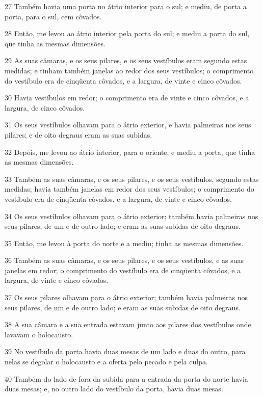 \par 27 Também havia uma porta no átrio interior para o sul; e mediu, de porta a porta, para o sul, cem côvados.
\par 28 Então, me levou ao átrio interior pela porta do sul; e mediu a porta do sul, que tinha as mesmas dimensões.
\par 29 As suas câmaras, e os seus pilares, e os seus vestíbulos eram segundo estas medidas; e tinham também janelas ao redor dos seus vestíbulos; o comprimento do vestíbulo era de cinqüenta côvados, e a largura, de vinte e cinco côvados.
\par 30 Havia vestíbulos em redor; o comprimento era de vinte e cinco côvados, e a largura, de cinco côvados.
\par 31 Os seus vestíbulos olhavam para o átrio exterior, e havia palmeiras nos seus pilares; e de oito degraus eram as suas subidas.
\par 32 Depois, me levou ao átrio interior, para o oriente, e mediu a porta, que tinha as mesmas dimensões.
\par 33 Também as suas câmaras, e os seus pilares, e os seus vestíbulos, segundo estas medidas; havia também janelas em redor dos seus vestíbulos; o comprimento do vestíbulo era de cinqüenta côvados, e a largura, de vinte e cinco côvados.
\par 34 Os seus vestíbulos olhavam para o átrio exterior; também havia palmeiras nos seus pilares, de um e de outro lado; e eram as suas subidas de oito degraus.
\par 35 Então, me levou à porta do norte e a mediu; tinha as mesmas dimensões.
\par 36 Também as suas câmaras, e os seus pilares, e os seus vestíbulos, e as suas janelas em redor; o comprimento do vestíbulo era de cinqüenta côvados, e a largura, de vinte e cinco côvados.
\par 37 Os seus pilares olhavam para o átrio exterior; também havia palmeiras nos seus pilares, de um e de outro lado; e eram as suas subidas de oito degraus.
\par 38 A sua câmara e a sua entrada estavam junto aos pilares dos vestíbulos onde lavavam o holocausto.
\par 39 No vestíbulo da porta havia duas mesas de um lado e duas do outro, para nelas se degolar o holocausto e a oferta pelo pecado e pela culpa.
\par 40 Também do lado de fora da subida para a entrada da porta do norte havia duas mesas; e, no outro lado do vestíbulo da porta, havia duas mesas.

